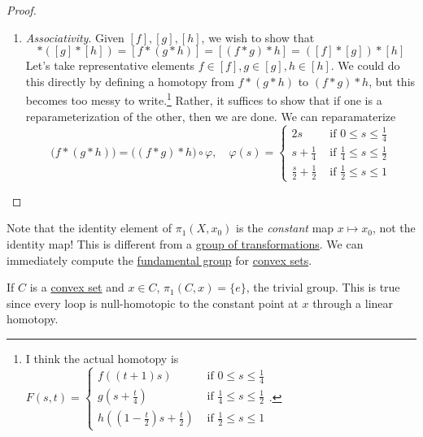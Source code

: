 \begin{proof}
\begin{enumerate}
			\item \textit{Associativity}. Given $[f], [g], [h]$, we wish to show that 
				\begin{equation}
					[f] \ast ([g] \ast [h]) = [f \ast (g \ast h)] = [(f \ast g) \ast h] = ([f] \ast [g]) \ast [h]
				\end{equation}
				Let's take representative elements $f \in [f], g \in [g], h \in [h]$. We could do this directly by defining a homotopy from $f \ast (g \ast h)$ to $(f \ast g) \ast h$, but this becomes too messy to write.\footnote{I think the actual homotopy is $F(s, t) = \begin{cases} f((t + 1) s) & \text{ if } 0 \leq s \leq \frac{1}{4} \\ g(s + \frac{t}{4}) & \text{ if } \frac{1}{4} \leq s \leq \frac{1}{2} \\ h((1 - \frac{t}{2})s + \frac{t}{2}) & \text{ if } \frac{1}{2} \leq s \leq 1 \end{cases}$.} Rather, it suffices to show that if one is a reparameterization of the other, then we are done. We can reparamaterize
				\begin{equation}
					\big( f \ast (g \ast h) \big) = \big( (f \ast g) \ast h \big) \circ \varphi, \quad \varphi(s) = \begin{cases} 
						2s & \text{ if } 0 \leq s \leq \frac{1}{4} \\ 
						s + \frac{1}{4} & \text{ if } \frac{1}{4} \leq s \leq \frac{1}{2} \\ 
						\frac{s}{2} + \frac{1}{2} & \text{ if } \frac{1}{2} \leq s \leq 1
					\end{cases}
				\end{equation}
		\end{enumerate}
	\end{proof}

  Note that the identity element of $\pi_1 (X, x_0)$ is the \textit{constant} map $x \mapsto x_0$, not the identity map! This is different from a \hyperref[alg-def:group-of-transformations]{group of transformations}. We can immediately compute the \hyperref[def:fundamental-group]{fundamental group} for \hyperref[st-def:convex-sets]{convex sets}. 

	\begin{example}
	  \label{ex:fundamental-group-of-convex-sets-are-trivial}
		If $C$ is a \hyperref[alg-def:convex-set]{convex set} and $x \in C$, $\pi_1 (C, x) = \{e\}$, the trivial group. This is true since every loop is null-homotopic to the constant point at $x$ through a linear homotopy. 
	\end{example}

